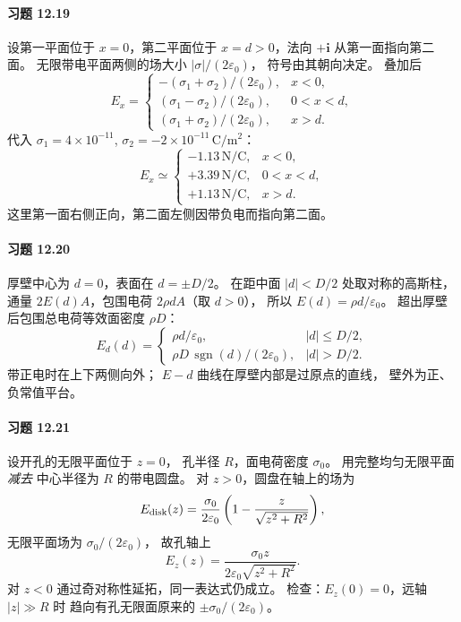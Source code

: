 \paragraph{习题 12.19}
设第一平面位于 \(x=0\)，第二平面位于
\(x=d>0\)，法向 \(+\boldsymbol i\) 从第一面指向第二面。
无限带电平面两侧的场大小
\(|\sigma|/(2\varepsilon_0)\)，
符号由其朝向决定。
叠加后
\[
 \boxed{E_x=
 \begin{cases}
 -(\sigma_1+\sigma_2)/(2\varepsilon_0),&x<0,\\
 (\sigma_1-\sigma_2)/(2\varepsilon_0),&0<x<d,\\
 (\sigma_1+\sigma_2)/(2\varepsilon_0),&x>d.
 \end{cases}}
\]
代入 \(\sigma_1=4\times10^{-11}\),
\(\sigma_2=-2\times10^{-11}\,\mathrm{C/m^2}\)：
\[
 E_x\simeq
 \begin{cases}
 -1.13\,\mathrm{N/C},&x<0,\\
 +3.39\,\mathrm{N/C},&0<x<d,\\
 +1.13\,\mathrm{N/C},&x>d.
 \end{cases}
\]
这里第一面右侧正向，第二面左侧因带负电而指向第二面。

\paragraph{习题 12.20}
厚壁中心为 \(d=0\)，表面在 \(d=\pm D/2\)。
在距中面 \(|d|<D/2\) 处取对称的高斯柱，
通量 \(2E(d)A\)，包围电荷
\(2\rho dA\)（取 \(d>0\)），
所以 \(E(d)=\rho d/\varepsilon_0\)。
超出厚壁后包围总电荷等效面密度
\(\rho D\)：
\[
 \boxed{E_d(d)=
 \begin{cases}
 \rho d/\varepsilon_0,&|d|\le D/2,\\
 \rho D\,\operatorname{sgn}(d)/(2\varepsilon_0),
 &|d|>D/2.
 \end{cases}}
\]
带正电时在上下两侧向外；
\(E-d\) 曲线在厚壁内部是过原点的直线，
壁外为正、负常值平台。

\paragraph{习题 12.21}
设开孔的无限平面位于 \(z=0\)，
孔半径 \(R\)，面电荷密度 \(\sigma_0\)。
用完整均匀无限平面\emph{减去}
中心半径为 \(R\) 的带电圆盘。
对 \(z>0\)，圆盘在轴上的场为
\[
 E_{\rm disk}(z)=\frac{\sigma_0}{2\varepsilon_0}
 \left(1-\frac{z}{\sqrt{z^2+R^2}}\right),
\]
无限平面场为 \(\sigma_0/(2\varepsilon_0)\)，
故孔轴上
\[
 \boxed{E_z(z)=\frac{\sigma_0z}
 {2\varepsilon_0\sqrt{z^2+R^2}}}.
\]
对 \(z<0\) 通过奇对称性延拓，同一表达式仍成立。
检查：\(E_z(0)=0\)，远轴 \(|z|\gg R\) 时
趋向有孔无限面原来的 \(\pm\sigma_0/(2\varepsilon_0)\)。

